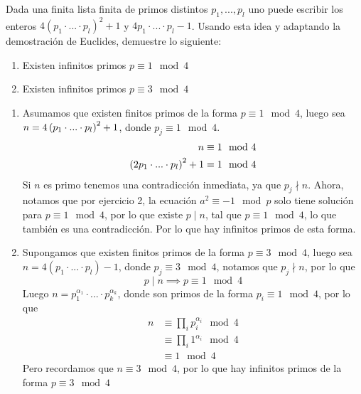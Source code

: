 \begin{prob}[3 pts c/u]
	Dada una finita lista finita de primos distintos $p_1,...,p_l$ uno puede escribir los enteros $4(p_1\cdot...\cdot p_l)^2+1$ y $4p_1\cdot...\cdot p_l-1$. Usando esta idea y adaptando la demostración de Euclides, demuestre lo siguiente:
	\begin{enumerate}[label = \roman*)]
		\item Existen infinitos primos $p\equiv 1\mod 4$

		\item Existen infinitos primos $p\equiv 3\mod 4$
	\end{enumerate}
\end{prob}

\begin{sol}
	\begin{enumerate}[label = \roman*)]
		\item Asumamos que existen finitos primos de la forma $p\equiv 1\mod 4$, luego sea $n=4\left(p_1\cdot...\cdot p_l\right)^2+1$, donde $p_j\equiv 1\mod 4$.
		      \begin{align*}
			      n                                 & \equiv 1\mod 4 \\
			      \left(2p_1\cdot...\cdot p_l\right)^2+1 & \equiv 1\mod 4
		      \end{align*}
		      Si $n$ es primo tenemos una contradicción inmediata, ya que $p_j\nmid n$. Ahora, notamos que por ejercicio 2, la ecuación $a^2\equiv-1\mod p$ solo tiene solución para $p\equiv 1\mod 4$, por lo que existe $p\mid n$, tal que $p\equiv 1\mod 4$, lo que también es una contradicción. Por lo que hay infinitos primos de esta forma.

		\item Supongamos que existen finitos primos de la forma $p\equiv 3\mod4$, luego sea $n=4(p_1\cdot...\cdot p_l)-1$, donde $p_j\equiv 3\mod 4$, notamos que $p_j\nmid n$, por lo que
		      \[p\mid n\implies p\equiv1\mod4\]
		      Luego $n=p_1^{\alpha_1}\cdot...\cdot p_k^{\alpha_k}$, donde son primos de la forma $p_i\equiv1\mod4$, por lo que
		      \begin{align*}
			      n & \equiv\prod_i p_i^{\alpha_i}\mod 4 \\
			        & \equiv\prod_i 1^{\alpha_i}\mod 4   \\
			        & \equiv1\mod 4
		      \end{align*}
		      Pero recordamos que $n\equiv 3\mod 4$, por lo que hay infinitos primos de la forma $p\equiv3\mod4$
	\end{enumerate}
\end{sol}

